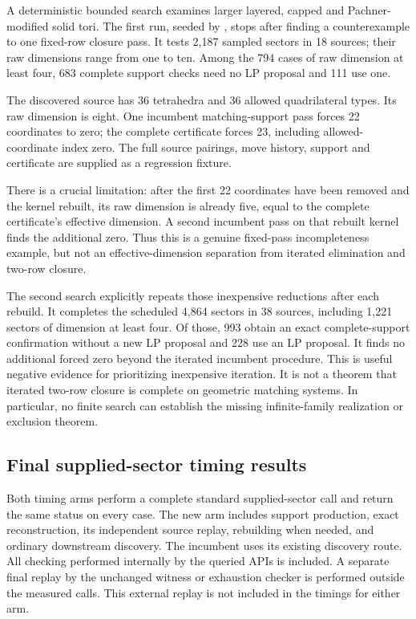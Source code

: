 A deterministic bounded search examines larger layered, capped and
Pachner-modified solid tori. The first run, seeded by
, stops after finding a
counterexample to one fixed-row closure pass. It tests 2,187 sampled
sectors in 18 sources; their raw dimensions range from one to ten.
Among the 794 cases of raw dimension at least four, 683 complete
support checks need no LP proposal and 111 use one.

The discovered source has 36 tetrahedra and 36 allowed quadrilateral
types. Its raw dimension is eight. One incumbent matching-support pass
forces 22 coordinates to zero; the complete certificate forces 23,
including allowed-coordinate index zero. The full source pairings,
move history, support and certificate are supplied as a regression
fixture.

There is a crucial limitation: after the first 22 coordinates have
been removed and the kernel rebuilt, its raw dimension is already
five, equal to the complete certificate's effective dimension.
A second incumbent pass on that rebuilt kernel finds the additional
zero. Thus this is a genuine fixed-pass incompleteness example, but
not an effective-dimension separation from iterated elimination and
two-row closure.

The second search explicitly repeats those inexpensive reductions
after each rebuild. It completes the scheduled 4,864 sectors in 38
sources, including 1,221 sectors of dimension at least four. Of those,
993 obtain an exact complete-support confirmation without a new LP
proposal and 228 use an LP proposal. It finds no additional forced zero
beyond the iterated incumbent procedure. This is useful negative
evidence for prioritizing inexpensive iteration. It is not a theorem
that iterated two-row closure is complete on geometric matching
systems. In particular, no finite search can establish the missing
infinite-family realization or exclusion theorem.

\subsection{Final supplied-sector timing results}

Both timing arms perform a complete standard supplied-sector call and
return the same status on every case. The new arm includes support
production, exact reconstruction, its independent source replay,
rebuilding when needed, and ordinary downstream discovery. The incumbent
uses its existing discovery route. All checking performed internally by
the queried APIs is included. A separate final replay by the unchanged
witness or exhaustion checker is performed outside the measured calls.
This external replay is not included in the timings for either arm.

